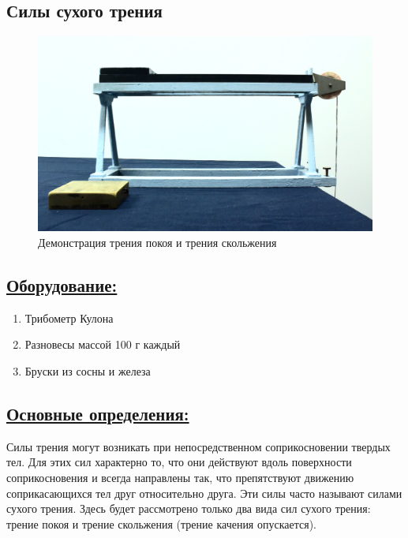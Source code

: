 \documentclass[14pt,a4paper,oneside]{extarticle}	%
\begin{document}

	
	\begin{center}
		\subsection*{Силы сухого трения}
	\end{center}
	
	\begin{figure}[H]
		\centering 	
		\includegraphics[width=0.9\linewidth]{friction-4.png}
		\caption{Демонстрация трения покоя и трения скольжения}
		\label{friction-4}
	\end{figure}
	
	\subsection*{\underline{Оборудование:}}
	
	\begin{enumerate} 
		\item Трибометр Кулона
		\item Разновесы массой 100 г каждый
		\item Бруски из сосны и железа
		
	\end{enumerate}

	\newpage	
	\subsection*{\underline{Основные определения:}}
	
Силы трения могут возникать при непосредственном соприкосновении твердых тел.
Для этих сил характерно то, что они действуют вдоль поверхности соприкосновения и всегда направлены 
	так, что препятствуют движению соприкасающихся тел друг относительно друга.
	Эти силы часто называют силами сухого трения. 
	Здесь будет рассмотрено только два вида сил сухого трения: трение покоя 
	и трение скольжения (трение качения опускается).
	
\end{document}
